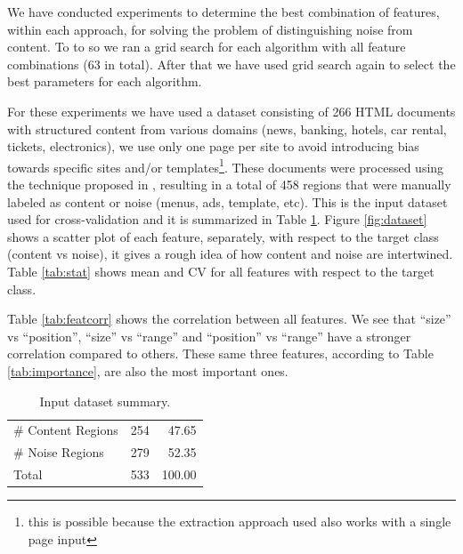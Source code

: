 We have conducted experiments to determine the best combination of features,
within each approach, for solving the problem of distinguishing noise from
content. To to so we ran a grid search for each algorithm with all feature
combinations (63 in total). After that we have used grid search again to select
the best parameters for each algorithm.

For these experiments we have used a dataset consisting of 266 HTML documents
with structured content from various domains (news, banking, hotels, car rental,
tickets, electronics), we use only one page per site to avoid introducing bias
towards specific sites and/or templates\footnote{this is possible because the
extraction approach used also works with a single page input}. These documents
were processed using the technique proposed in
\cite{Velloso:2017:ERW:3132847.3132875}, resulting in a total of 458 regions
that were manually labeled as content or noise (menus, ads, template, etc). This
is the input dataset used for cross-validation and it is summarized in Table
\ref{tab:dataset}. Figure \ref{fig:dataset} shows a scatter plot of each
feature, separately, with respect to the target class (content vs noise), it
gives a rough idea of how content and noise are intertwined. Table
\ref{tab:stat} shows mean and CV for all features with respect to the target
class.

Table \ref{tab:featcorr} shows the correlation between all features. We see that
``size'' vs ``position'', ``size'' vs ``range'' and ``position'' vs ``range''
have a stronger correlation compared to others. These same three features,
according to Table \ref{tab:importance}, are also the most important ones.

 
\begin{table}[h]
\centering
\caption{Input dataset summary.}
\label{tab:dataset}
\begin{tabular}{ | l | l | r |}
\hline
\# Content Regions & 254 & 47.65 \\
\# Noise Regions & 279 & 52.35 \\
\hline
Total & 533 & 100.00 \\
\hline
\end{tabular}
\end{table}

